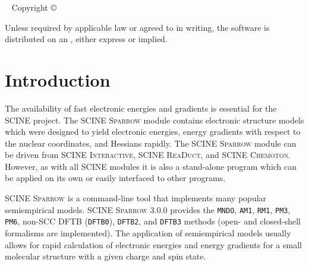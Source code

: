 \documentclass[]{tufte-book}
\title[SCINE Sparrow manual]{User Manual \vskip 0.5em {\setlength{\parindent}{0pt} \Huge SCINE Sparrow 3.0.0}}
\author[The SCINE Sparrow Developers]{The SCINE Sparrow Developers: \newline \noindent Francesco Bosia, Tamara Husch, Charlotte H.~M\"uller, Severin Polonius, Jan-Grimo Sobez, Miguel Steiner, Jan P.~Unsleber, Alain C.~Vaucher, Thomas Weymuth, and Markus Reiher}
\newcommand{\monthyear}{%
  \ifcase\month\or January\or February\or March\or April\or May\or June\or
  July\or August\or September\or October\or November\or
  December\fi\space\number\year
}
\begin{document}
\setlength{\parindent}{0pt}

\frontmatter


\maketitle


\newpage
\begin{fullwidth}
~\vfill
\thispagestyle{empty}
\setlength{\parindent}{0pt}
\setlength{\parskip}{\baselineskip}
Copyright \copyright\ \the\year\ \thanklessauthor


\par{}

\par Unless required by applicable law or agreed to in writing, the software 
is distributed on an , either express or implied. 

\end{fullwidth}

\tableofcontents




\mainmatter

\let\cleardoublepage\clearpage
\chapter{Introduction}

The availability of fast electronic energies and gradients is essential for the SCINE project. The SCINE \textsc{Sparrow} 
module contains electronic structure models which were designed to yield electronic energies, energy gradients with 
respect to the nuclear coordinates, and Hessians rapidly. The SCINE \textsc{Sparrow} module can be driven from SCINE 
\textsc{Interactive}, SCINE \textsc{ReaDuct}, and SCINE \textsc{Chemoton}. However, as with all SCINE modules it is also 
a stand-alone program which can be applied on its own or easily interfaced to other programs.

SCINE \textsc{Sparrow} is a command-line tool that implements many popular semiempirical models. SCINE \textsc{Sparrow} 3.0.0 
provides the \texttt{MNDO}, \texttt{AM1}, \texttt{RM1}, \texttt{PM3}, \texttt{PM6}, non-SCC DFTB (\texttt{DFTB0}), \texttt{DFTB2}, and \texttt{DFTB3} methods 
(open- and closed-shell formalisms are implemented). 
The application of semiempirical models usually allows for rapid calculation of electronic energies and energy gradients 
for a small molecular structure with a given charge and spin state.
\end{document}
